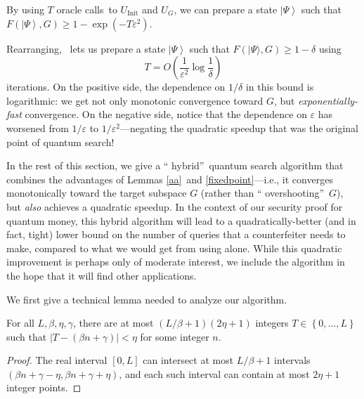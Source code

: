 \begin{lemma}
\label{fixedpoint}By using $T$
oracle calls\ to $U_{\operatorname*{Init}}$ and $U_{G}$, we can prepare a
state $\left\vert \Psi\right\rangle $ such that $F\left(  \left\vert
\Psi\right\rangle ,G\right)  \geq1-\exp(  -T\varepsilon^{2})$.
\end{lemma}

Rearranging, \ lets us prepare a state $\left\vert
\Psi\right\rangle $ such that $F(\vert \Psi\rangle
,G)  \geq1-\delta$ using 
\[
T=O\left(\frac{1}{\varepsilon^{2}}\log
\frac{1}{\delta}\right)
\]
iterations. On the positive side, the dependence
on $1/\delta$ in this bound is logarithmic: we get not only monotonic
convergence toward $G$, but \emph{exponentially-fast} convergence. On the
negative side, notice that the dependence on $\varepsilon$ has worsened from
$1/\varepsilon$ to $1/\varepsilon^{2}$---negating the quadratic speedup that
was the original point of quantum search!

In the rest of this section, we give a \textquotedblleft
hybrid\textquotedblright\ quantum search algorithm that combines the
advantages of Lemmas \ref{aa}\ and \ref{fixedpoint}---i.e., it converges
monotonically toward the target subspace $G$ (rather than \textquotedblleft
overshooting\textquotedblright\ $G$), but \emph{also} achieves a quadratic
speedup. In the context of our security proof for quantum money, this hybrid
algorithm will lead to a quadratically-better (and in fact, tight) lower bound
on the number of queries that a counterfeiter needs to make, compared to what
we would get from using  alone. While this quadratic
improvement is perhaps only of moderate interest, we include the algorithm in
the hope that it will find other applications.

We first give a technical lemma needed to analyze our algorithm.

\begin{lemma}
\label{interval}For all $L,\beta,\eta,\gamma$, there are at most $\left(
L/\beta+1\right)  \left(  2\eta+1\right)  $ integers $T\in\left\{
0,\ldots,L\right\}$ such that $\left\vert T-\left(  \beta n+\gamma\right)
\right\vert <\eta$ for some integer $n$.
\end{lemma}

\begin{proof}
The real interval $\left[  0,L\right]  $ can intersect at most $L/\beta
+1$ intervals $\left(  \beta n+\gamma-\eta,\beta n+\gamma+\eta\right)  $, and
each such interval can contain at most $2\eta+1$ integer points.
\end{proof}

